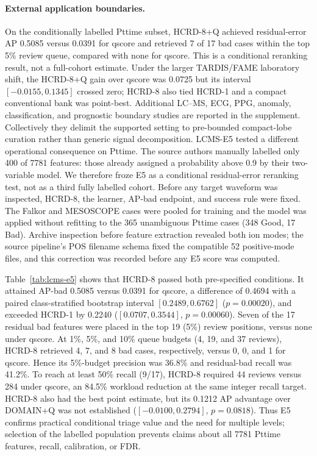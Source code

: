 \documentclass[review,onefignum,onetabnum]{siamonline250211}
\begin{document}
\paragraph{External application boundaries.}
On the conditionally labelled Pttime subset, HCRD-8+Q achieved residual-error
AP 0.5085 versus 0.0391 for qscore and retrieved 7 of 17 bad cases within the
top 5\% review queue, compared with none for qscore.  This is a conditional
reranking result, not a full-cohort estimate.  Under the larger TARDIS/FAME
laboratory shift, the HCRD-8+Q gain over qscore was 0.0725 but its interval
$[-0.0155,0.1345]$ crossed zero; HCRD-8 also tied HCRD-1 and a compact
conventional bank was point-best.  Additional LC--MS, ECG, PPG, anomaly,
classification, and prognostic boundary studies are reported in the
supplement.  Collectively they delimit the supported setting to pre-bounded
compact-lobe curation rather than generic signal decomposition.
\else
LCMS-E5 tested a different operational consequence on Pttime.  The source
authors manually labelled only 400 of 7781 features: those already assigned a
probability above 0.9 by their two-variable model.  We therefore froze E5 as a
conditional residual-error reranking test, not as a third fully labelled
cohort.  Before any target waveform was inspected, HCRD-8, the learner,
AP-bad endpoint, and success rule were fixed.  The Falkor and MESOSCOPE cases
were pooled for training and the model was applied without refitting to the 365
unambiguous Pttime cases (348 Good, 17 Bad).  Archive inspection before feature
extraction revealed both ion modes; the source pipeline's POS filename schema
fixed the compatible 52 positive-mode files, and this correction was recorded
before any E5 score was computed.

Table~\ref{tab:lcms-e5} shows that HCRD-8 passed both pre-specified conditions.
It attained AP-bad 0.5085 versus 0.0391 for qscore, a difference of 0.4694 with
a paired class-stratified bootstrap interval $[0.2489,0.6762]$
($p=0.00020$), and exceeded HCRD-1 by 0.2240
($[0.0707,0.3544]$, $p=0.00060$).  Seven of the 17 residual bad features were
placed in the top 19 (5\%) review positions, versus none under qscore.  At
1\%, 5\%, and 10\% queue budgets (4, 19, and 37 reviews), HCRD-8 retrieved
4, 7, and 8 bad cases, respectively, versus 0, 0, and 1 for qscore.  Hence its
5\%-budget precision was 36.8\% and residual-bad recall was 41.2\%.  To reach
at least 50\% recall (9/17), HCRD-8 required 44 reviews versus 284 under
qscore, an 84.5\% workload reduction at the same integer recall target.  HCRD-8
also had the best point estimate, but its 0.1212 AP advantage over DOMAIN+Q was
not established ($[-0.0100,0.2794]$, $p=0.0818$).  Thus E5 confirms practical
conditional triage value and the need for multiple levels; selection of the
labelled population prevents claims about all 7781 Pttime features, recall,
calibration, or FDR.
\end{document}
